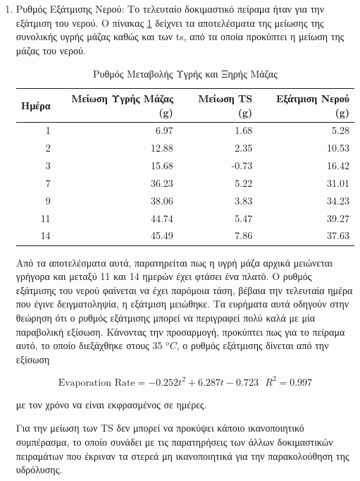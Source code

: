 \documentclass[11pt]{report}
\begin{document}
\begin{enumerate}
\item Ρυθμός Εξάτμισης Νερού:
\label{sec:org568cd4d}
Το τελευταίο δοκιμαστικό πείραμα ήταν για την εξάτμιση του νερού. Ο πίνακας \ref{tab:orge1057e2} δείχνει τα αποτελέσματα της μείωσης της συνολικής υγρής μάζας καθώς και των \acrshort{ts}, από τα οποία προκύπτει η μείωση της μάζας του νερού.

\begin{table}[htbp]
\caption{\label{tab:orge1057e2}Ρυθμός Μεταβολής Υγρής και Ξηρής Μάζας}
\centering
\begin{tabular}{rrrr}
Ημέρα & Μείωση Υγρής Μάζας (g) & Μείωση TS (g) & Εξάτμιση Νερού (g)\\[0pt]
\hline
1 & 6.97 & 1.68 & 5.28\\[0pt]
2 & 12.88 & 2.35 & 10.53\\[0pt]
3 & 15.68 & -0.73 & 16.42\\[0pt]
7 & 36.23 & 5.22 & 31.01\\[0pt]
9 & 38.06 & 3.83 & 34.23\\[0pt]
11 & 44.74 & 5.47 & 39.27\\[0pt]
14 & 45.49 & 7.86 & 37.63\\[0pt]
\end{tabular}
\end{table}

Από τα αποτελέσματα αυτά, παρατηρείται πως η υγρή μάζα αρχικά μειώνεται γρήγορα και μεταξύ 11 και 14 ημερών έχει φτάσει ένα πλατό. Ο ρυθμός εξάτμισης του νερού φαίνεται να έχει παρόμοια τάση, βέβαια την τελευταία ημέρα που έγινε δειγματοληψία, η εξάτμιση μειώθηκε. Τα ευρήματα αυτά οδηγούν στην θεώρηση ότι ο ρυθμός εξάτμισης μπορεί να περιγραφεί πολύ καλά με μία παραβολική εξίσωση. Κάνοντας την προσαρμογή, προκύπτει πως για το πείραμα αυτό, το οποίο διεξάχθηκε στους 35 \(^oC\), ο ρυθμός εξάτμισης δίνεται από την εξίσωση

\[ \text{Evaporation Rate} = -0.252t^2 + 6.287t - 0.723 ~ ~ ~ R^2 = 0.997 \]

με τον χρόνο να είναι εκφρασμένος σε ημέρες.

Για την μείωση των TS δεν μπορεί να προκύψει κάποιο ικανοποιητικό συμπέρασμα, το οποίο συνάδει με τις παρατηρήσεις των άλλων δοκιμαστικών πειραμάτων που έκριναν τα στερεά μη ικανοποιητικά για την παρακολούθηση της υδρόλυσης.
\end{enumerate}
\end{document}
